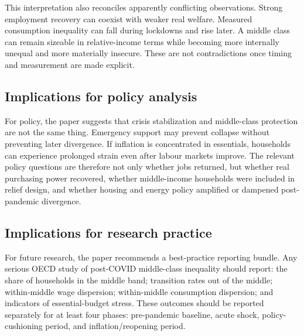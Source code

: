 \documentclass[11pt]{article}
\begin{document}
This interpretation also reconciles apparently conflicting observations. Strong employment recovery can coexist with weaker real welfare. Measured consumption inequality can fall during lockdowns and rise later. A middle class can remain sizeable in relative-income terms while becoming more internally unequal and more materially insecure. These are not contradictions once timing and measurement are made explicit.

\subsection{Implications for policy analysis}
For policy, the paper suggests that crisis stabilization and middle-class protection are not the same thing. Emergency support may prevent collapse without preventing later divergence. If inflation is concentrated in essentials, households can experience prolonged strain even after labour markets improve. The relevant policy questions are therefore not only whether jobs returned, but whether real purchasing power recovered, whether middle-income households were included in relief design, and whether housing and energy policy amplified or dampened post-pandemic divergence.

\subsection{Implications for research practice}
For future research, the paper recommends a best-practice reporting bundle. Any serious OECD study of post-COVID middle-class inequality should report: the share of households in the middle band; transition rates out of the middle; within-middle wage dispersion; within-middle consumption dispersion; and indicators of essential-budget stress. These outcomes should be reported separately for at least four phases: pre-pandemic baseline, acute shock, policy-cushioning period, and inflation/reopening period.
\end{document}
